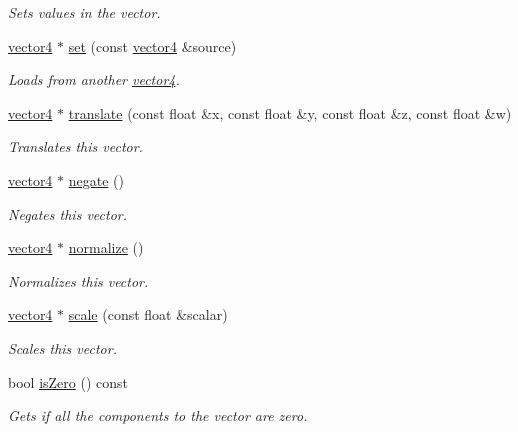 \begin{DoxyCompactItemize}
\begin{DoxyCompactList}\small\item\em Sets values in the vector. \end{DoxyCompactList}\item 
\hyperlink{classflounder_1_1vector4}{vector4} $\ast$ \hyperlink{classflounder_1_1vector4_a57a89cbc720c8d7c439d915fddf03048}{set} (const \hyperlink{classflounder_1_1vector4}{vector4} \&source)
\begin{DoxyCompactList}\small\item\em Loads from another \hyperlink{classflounder_1_1vector4}{vector4}. \end{DoxyCompactList}\item 
\hyperlink{classflounder_1_1vector4}{vector4} $\ast$ \hyperlink{classflounder_1_1vector4_a3aa7c17918a15e289b0ae6b77a4cb27d}{translate} (const float \&x, const float \&y, const float \&z, const float \&w)
\begin{DoxyCompactList}\small\item\em Translates this vector. \end{DoxyCompactList}\item 
\hyperlink{classflounder_1_1vector4}{vector4} $\ast$ \hyperlink{classflounder_1_1vector4_a024aa43916f5c77623010019e31c5791}{negate} ()
\begin{DoxyCompactList}\small\item\em Negates this vector. \end{DoxyCompactList}\item 
\hyperlink{classflounder_1_1vector4}{vector4} $\ast$ \hyperlink{classflounder_1_1vector4_aa9eec0ab63428f78de24ac90f2a20206}{normalize} ()
\begin{DoxyCompactList}\small\item\em Normalizes this vector. \end{DoxyCompactList}\item 
\hyperlink{classflounder_1_1vector4}{vector4} $\ast$ \hyperlink{classflounder_1_1vector4_af31ae2dc6c068dd8ca5f831418e61d0f}{scale} (const float \&scalar)
\begin{DoxyCompactList}\small\item\em Scales this vector. \end{DoxyCompactList}\item 
bool \hyperlink{classflounder_1_1vector4_a6fdd6ed7ac306906c8d28aa10159f5c5}{is\+Zero} () const
\begin{DoxyCompactList}\small\item\em Gets if all the components to the vector are zero. \end{DoxyCompactList}\item 

\end{DoxyCompactItemize}
